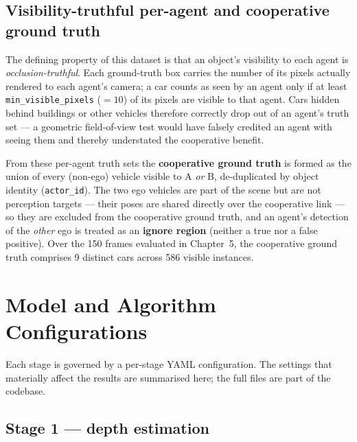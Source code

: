 \subsection{Visibility-truthful per-agent and cooperative ground truth}
\label{sec:coopgt}

The defining property of this dataset is that an object's visibility to each agent is
\emph{occlusion-truthful}. Each ground-truth box carries the number of its pixels
actually rendered to each agent's camera; a car counts as seen by an agent only if at
least \texttt{min\_visible\_pixels} ($=10$) of its pixels are visible to that agent.
Cars hidden behind buildings or other vehicles therefore correctly drop out of an
agent's truth set --- a geometric field-of-view test would have falsely credited an
agent with seeing them and thereby understated the cooperative benefit.

From these per-agent truth sets the \textbf{cooperative ground truth} is formed as
the union of every (non-ego) vehicle visible to A \emph{or} B, de-duplicated by
object identity (\texttt{actor\_id}). The two ego vehicles are part of the scene but
are not perception targets --- their poses are shared directly over the cooperative
link --- so they are excluded from the cooperative ground truth, and an agent's
detection of the \emph{other} ego is treated as an \textbf{ignore region} (neither a
true nor a false positive). Over the 150 frames evaluated in Chapter~5, the
cooperative ground truth comprises 9 distinct cars across 586 visible instances.

\section{Model and Algorithm Configurations}
\label{sec:configs}

Each stage is governed by a per-stage YAML configuration. The settings that
materially affect the results are summarised here; the full files are part of the
codebase.

\subsection{Stage 1 --- depth estimation}
\label{sec:stage1cfg}

